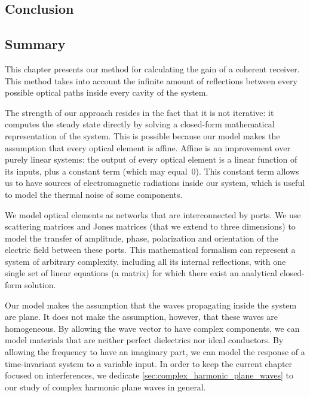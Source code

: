 \begin{refsection}
\FloatBarrier
\section{Conclusion}




\subsection{Summary}
This chapter presents our method for calculating the gain of a coherent receiver.
This method takes into account the infinite amount of reflections between every possible optical paths inside every cavity of the system.

The strength of our approach resides in the fact that it is not iterative: it computes the steady state directly by solving a closed-form mathematical representation of the system.
This is possible because our model makes the assumption that every optical element is affine.
Affine is an improvement over purely linear systems: the output of every optical element is a linear function of its inputs, plus a constant term (which may equal~0).
This constant term allows us to have sources of electromagnetic radiations inside our system, which is useful to model the thermal noise of some components.

We model optical elements as networks that are interconnected by ports.
We use scattering matrices and Jones matrices (that we extend to three dimensions) to model the transfer of amplitude, phase, polarization and orientation of the electric field between these ports.
This mathematical formalism can represent a system of arbitrary complexity, including all its internal reflections, with one single set of linear equations (a matrix) for which there exist an analytical closed-form solution.

Our model makes the assumption that the waves propagating inside the system are plane.
It does not make the assumption, however, that these waves are homogeneous.
By allowing the wave vector to have complex components, we can model materials that are neither perfect dielectrics nor ideal conductors.
By allowing the frequency to have an imaginary part, we can model the response of a time-invariant system to a variable input.
In order to keep the current chapter focused on interferences,
we dedicate \cref{sec:complex_harmonic_plane_waves} to our study of complex harmonic plane waves in general.


\end{refsection}
